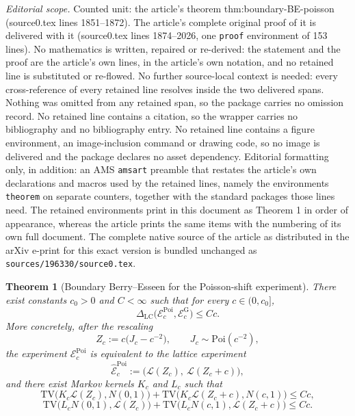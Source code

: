 \documentclass[10pt,a4paper]{amsart}
\newtheorem{theorem}{Theorem}
\newcommand{\LC}{\Delta_{\mathrm{LC}}}
\newcommand{\Poi}{\mathrm{Poi}}
\newcommand{\TV}{\mathrm{TV}}
\begin{document}
\noindent\textit{Editorial scope.} Counted unit: the article's theorem thm:boundary-BE-poisson (source0.tex lines 1851--1872). The article's complete original proof of it is delivered with it (source0.tex lines 1874--2026, one \texttt{proof} environment of 153 lines). No mathematics is written, repaired or re-derived: the statement and the proof are the article's own lines, in the article's own notation, and no retained line is substituted or re-flowed.  No further source-local context is needed: every cross-reference of every retained line resolves inside the two delivered spans.  Nothing was omitted from any retained span, so the package carries no omission record.  No retained line contains a citation, so the wrapper carries no bibliography and no bibliography entry.  No retained line contains a figure environment, an image-inclusion command or drawing code, so no image is delivered and the package declares no asset dependency.  Editorial formatting only, in addition: an AMS \texttt{amsart} preamble that restates the article's own declarations and macros used by the retained lines, namely the environments \texttt{theorem} on separate counters, together with the standard packages those lines need.  The retained environments print in this document as Theorem 1 in order of appearance, whereas the article prints the same items with the numbering of its own full document.  The complete native source of the article as distributed in the arXiv e-print for this exact version is bundled unchanged as \texttt{sources/196330/source0.tex}.
\begin{theorem}[Boundary Berry--Esseen for the Poisson-shift experiment]
\label{thm:boundary-BE-poisson}
There exist constants $c_0>0$ and $C<\infty$ such that for every $c\in(0,c_0]$,
\[
\LC\bigl(\mathcal E_c^{\mathrm{Poi}},\mathcal E_c^{\mathrm G}\bigr)\le Cc.
\]
More concretely, after the rescaling
\[
Z_c:=c\bigl(J_c-c^{-2}\bigr),\qquad J_c\sim\Poi(c^{-2}),
\]
the experiment $\mathcal E_c^{\mathrm{Poi}}$ is equivalent to the lattice experiment
\[
\widehat{\mathcal E}_c^{\mathrm{Poi}}:=\bigl(\mathcal L(Z_c),\ \mathcal L(Z_c+c)\bigr),
\]
and there exist Markov kernels $K_c$ and $L_c$ such that
\[
\TV\bigl(K_c\mathcal L(Z_c),N(0,1)\bigr)+\TV\bigl(K_c\mathcal L(Z_c+c),N(c,1)\bigr)\le Cc,
\]
\[
\TV\bigl(L_cN(0,1),\mathcal L(Z_c)\bigr)+\TV\bigl(L_cN(c,1),\mathcal L(Z_c+c)\bigr)\le Cc.
\]
\end{theorem}
\end{document}

